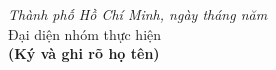 
\vspace{2cm}

\begin{flushright}
    \textit{Thành phố Hồ Chí Minh, ngày \underline{\hspace{1cm}} tháng \underline{\hspace{1cm}} năm \underline{\hspace{1cm}}} \\[1.2em]
    Đại diện nhóm thực hiện \\[2em]
    \textbf{(Ký và ghi rõ họ tên)}
\end{flushright}